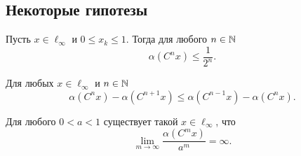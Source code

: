 \subsection{Некоторые гипотезы}

\begin{hypothesis}
	Пусть $x\in\ell_\infty$ и $0 \leq x_k \leq 1$.
	Тогда для любого $n\in\mathbb{N}$
	\begin{equation}
		\alpha(C^n x) \leq \frac{1}{2^n}
		.
	\end{equation}
\end{hypothesis}

\begin{hypothesis}
	Для любых $x\in\ell_\infty$ и $n\in\mathbb{N}$
	\begin{equation}
		\alpha(C^n x) - \alpha(C^{n+1} x) \leq \alpha(C^{n-1} x) - \alpha(C^{n} x)
		.
	\end{equation}
\end{hypothesis}

\begin{hypothesis}
	Для любого $0<a<1$ существует такой $x\in\ell_\infty$, что
	\begin{equation}
		\lim_{m\to\infty} \frac{\alpha(C^m x)}{a^m} = \infty
		.
	\end{equation}
\end{hypothesis}
